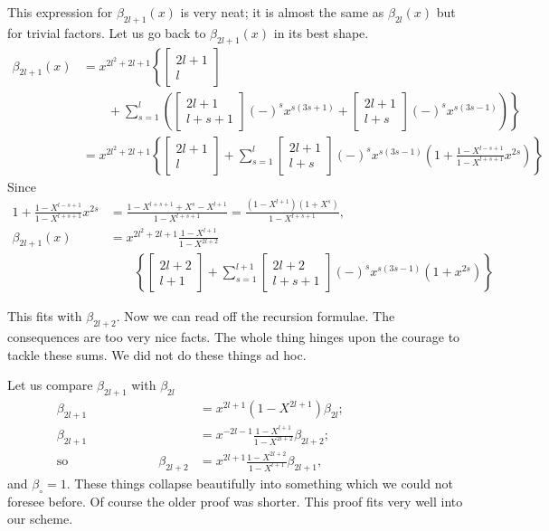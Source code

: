This expression for $\beta_{2l+1}(x)$ is very neat; it is almost the
same as $\beta_{2l}(x)$ but for trivial factors. Let us go back to
$\beta_{2l+1} (x)$ in its best shape.
\begin{align*}
  \beta_{2l+1} (x) & = x^{2l^2+ 2l+1}
  \left\{ \begin{bmatrix}2l+1\\l\end{bmatrix}\right.\\ 
    & \left.\qquad + \sum^l_{s=1}
    \left( \begin{bmatrix}2l+1\\l+s+1\end{bmatrix} (-)^s x^{s(3s+1)}
      + \begin{bmatrix}2l+1\\l+s\end{bmatrix} (-)^s
        x^{s(3s-1)}\right)\right\}\\
    & =x^{2l^2+2l +1}\left\{ \begin{bmatrix}2l+1\\l\end{bmatrix} +
          \sum^l_{s=1} \begin{bmatrix}2l+1\\l+s\end{bmatrix} (-)^s
            x^{s(3s-1)} \left(1+ \frac{1
              -X^{l-s+1}}{1-X^{l+s+1}}x^{2s}\right)\right\} 
\end{align*}
Since\pageoriginale
\begin{align*}
  1+ \frac{1-X^{l-s+1}}{1-X^{l+s+1}} x^{2s} & = \frac{1-X^{l+s+1}+ X^s
    - X^{l+1}}{1-X^{l+s+1}} =
  \frac{(1-X^{l+1})(1+X^s)}{1-X^{l+s+1}},\\
  \beta_{2l+1} (x) & = x^{2l^2+2l+1} \frac{1-X^{l+1}}{1-X^{2l+2}}\\
  &\qquad  \left\{ \begin{bmatrix}2l+2\\l+1\end{bmatrix} + \sum^{l+1}_{s=1} 
    \begin{bmatrix}2l+2\\l+s+1\end{bmatrix} (-)^s x^{s(3s-1)} (1+x^{2s})\right\}
\end{align*}

This fits with $\beta_{2l+2}$. Now we can read off the recursion
formulae. The consequences are too very nice facts. The whole thing
hinges upon the courage to tackle these sums. We did not do these
things ad hoc.

Let us compare $\beta_{2l+1}$ with $\beta_{2l}$
\begin{align*}
  \beta_{2l+1} & = x^{2l+1} (1-X^{2l+1}) \beta_{2l};\\
  \beta_{2l+1} & = x^{-2l-1} \frac{1-X^{l+1}}{1-X^{2l+2}}
  \beta_{2l+2};\\
  \text{so} \hspace{3cm} \beta_{2l+2} & = x^{2l+1}
  \frac{1-X^{2l+2}}{1-X^{l+1}} \beta_{2l+1}, \hspace{3cm}
\end{align*}
and $\beta_\circ =1$. These things collapse beautifully into something
which we could not foresee before. Of course the older proof was
shorter. This proof fits very well into our scheme. 
